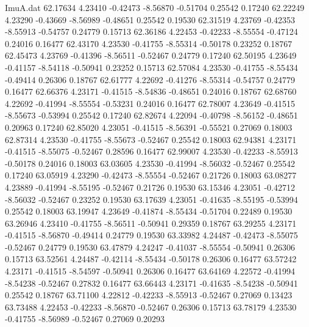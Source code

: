 \begin{filecontents}{ImuA.dat}
  62.17634    4.23410   -0.42473   -8.56870   -0.51704    0.25542    0.17240
  62.22249    4.23290   -0.43669   -8.56989   -0.48651    0.25542    0.19530
  62.31519    4.23769   -0.42353   -8.55913   -0.54757    0.24779    0.15713
  62.36186    4.22453   -0.42233   -8.55554   -0.47124    0.24016    0.16477
  62.43170    4.23530   -0.41755   -8.55314   -0.50178    0.23252    0.18767
  62.45473    4.23769   -0.41396   -8.56511   -0.52467    0.24779    0.17240
  62.50195    4.23649   -0.41157   -8.54118   -0.50941    0.23252    0.15713
  62.57084    4.23530   -0.41755   -8.55434   -0.49414    0.26306    0.18767
  62.61777    4.22692   -0.41276   -8.55314   -0.54757    0.24779    0.16477
  62.66376    4.23171   -0.41515   -8.54836   -0.48651    0.24016    0.18767
  62.68760    4.22692   -0.41994   -8.55554   -0.53231    0.24016    0.16477
  62.78007    4.23649   -0.41515   -8.55673   -0.53994    0.25542    0.17240
  62.82674    4.22094   -0.40798   -8.56152   -0.48651    0.20963    0.17240
  62.85020    4.23051   -0.41515   -8.56391   -0.55521    0.27069    0.18003
  62.87314    4.23530   -0.41755   -8.55673   -0.52467    0.25542    0.18003
  62.94381    4.23171   -0.41515   -8.55075   -0.52467    0.28596    0.16477
  62.99007    4.23530   -0.42233   -8.55913   -0.50178    0.24016    0.18003
  63.03605    4.23530   -0.41994   -8.56032   -0.52467    0.25542    0.17240
  63.05919    4.23290   -0.42473   -8.55554   -0.52467    0.21726    0.18003
  63.08277    4.23889   -0.41994   -8.55195   -0.52467    0.21726    0.19530
  63.15346    4.23051   -0.42712   -8.56032   -0.52467    0.23252    0.19530
  63.17639    4.23051   -0.41635   -8.55195   -0.53994    0.25542    0.18003
  63.19947    4.23649   -0.41874   -8.55434   -0.51704    0.22489    0.19530
  63.26946    4.23410   -0.41755   -8.56511   -0.50941    0.29359    0.18767
  63.29255    4.23171   -0.41515   -8.56870   -0.49414    0.24779    0.19530
  63.33982    4.24487   -0.42473   -8.55075   -0.52467    0.24779    0.19530
  63.47879    4.24247   -0.41037   -8.55554   -0.50941    0.26306    0.15713
  63.52561    4.24487   -0.42114   -8.55434   -0.50178    0.26306    0.16477
  63.57242    4.23171   -0.41515   -8.54597   -0.50941    0.26306    0.16477
  63.64169    4.22572   -0.41994   -8.54238   -0.52467    0.27832    0.16477
  63.66443    4.23171   -0.41635   -8.54238   -0.50941    0.25542    0.18767
  63.71100    4.22812   -0.42233   -8.55913   -0.52467    0.27069    0.13423
  63.73488    4.22453   -0.42233   -8.56870   -0.52467    0.26306    0.15713
  63.78179    4.23530   -0.41755   -8.56989   -0.52467    0.27069    0.20293

\end{filecontents}
